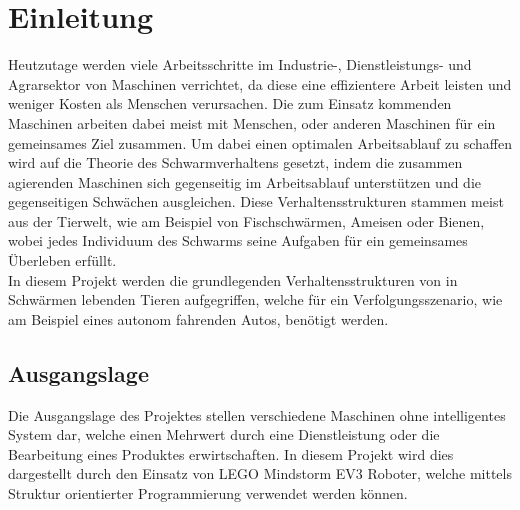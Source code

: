 \setcounter{page}{1}
\ofoot{\pagemark}

\section{Einleitung}

Heutzutage werden viele Arbeitsschritte im Industrie-, Dienstleistungs- und Agrarsektor von Maschinen verrichtet, da diese eine effizientere Arbeit leisten und weniger Kosten als Menschen verursachen. Die zum Einsatz kommenden Maschinen arbeiten dabei meist mit Menschen, oder anderen Maschinen für ein gemeinsames Ziel zusammen. Um dabei einen optimalen Arbeitsablauf zu schaffen wird auf die Theorie des Schwarmverhaltens gesetzt, indem die zusammen agierenden Maschinen sich gegenseitig im Arbeitsablauf unterstützen und die gegenseitigen Schwächen ausgleichen. Diese Verhaltensstrukturen stammen meist aus der Tierwelt, wie am Beispiel von Fischschwärmen, Ameisen oder Bienen, wobei jedes Individuum des Schwarms seine Aufgaben für ein gemeinsames Überleben erfüllt.\\
In diesem Projekt werden die grundlegenden Verhaltensstrukturen von in Schwärmen lebenden Tieren aufgegriffen, welche für ein Verfolgungsszenario, wie am Beispiel eines autonom fahrenden Autos, benötigt werden.

\begin{comment}
Um den Ablauf der Arbeitsschritte, der zum Einsatz kommenden Maschinen zu optimieren, setzen viele auf ein Schwarmverhalten, welches eine Kommunikation

	In diesem Projekt werden diese Verhaltensmuster aus dem Tierreich aufgegriffen und anhand eines Verhaltensszenarios mit Kleinrobotern verwirklicht, die autonom agieren und kommunizieren, um zusammen ihr Ziel zu erreichen. Dabei sollen Konzepte, sowie Algorithmen für Schwarmroboter entstehen, die auch auf andere Szenarien angewendet werden können.\\
\end{comment}

\newpage
\subsection{Ausgangslage}

Die Ausgangslage des Projektes stellen verschiedene Maschinen ohne intelligentes System dar, welche einen Mehrwert durch eine Dienstleistung oder die Bearbeitung eines Produktes erwirtschaften. In diesem Projekt wird dies dargestellt durch den Einsatz von LEGO Mindstorm EV3 Roboter, welche mittels Struktur orientierter Programmierung verwendet werden können.

